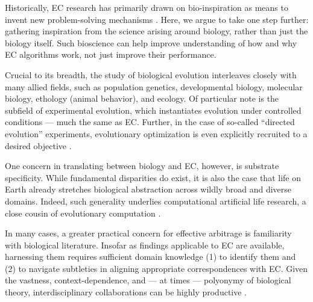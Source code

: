 Historically, EC research has primarily drawn on bio-inspiration as means to invent new problem-solving mechanisms \citep{banzhaf2006artificial,kumar2003biologically,mcphee2009developmental,gaperov2024leveraging,mouret2010importing}.
Here, we argue to take one step further: gathering inspiration from the science arising around biology, rather than just the biology itself.
Such bioscience can help improve understanding of how and why EC algorithms work, not just improve their performance.

Crucial to its breadth, the study of biological evolution interleaves closely with many allied fields, such as population genetics, developmental biology, molecular biology, ethology (animal behavior), and ecology.
Of particular note is the subfield of experimental evolution, which instantiates evolution under controlled conditions \citep{kawecki2012experimental} --- much the same as EC.
Further, in the case of so-called ``directed evolution'' experiments, evolutionary optimization is even explicitly recruited to a desired objective \citep{cobb2013directed,carroll2014applying}.

One concern in translating between biology and EC, however, is substrate specificity.
While fundamental disparities do exist, it is also the case that life on Earth already stretches biological abstraction across wildly broad and diverse domains.
Indeed, such generality underlies computational artificial life research, a close cousin of evolutionary computation \citep{cleland2012general,langton1989artificial,pennock2007models}. %

In many cases, a greater practical concern for effective arbitrage is familiarity with biological literature.
Insofar as findings applicable to EC are available, harnessing them requires sufficient domain knowledge (1) to identify them and (2) to navigate subtleties in aligning appropriate correspondences with EC.
Given the vastness, context-dependence, and --- at times --- polyonymy of biological theory, interdisciplinary collaborations can be highly productive \citep{goodman2020evolution}.

